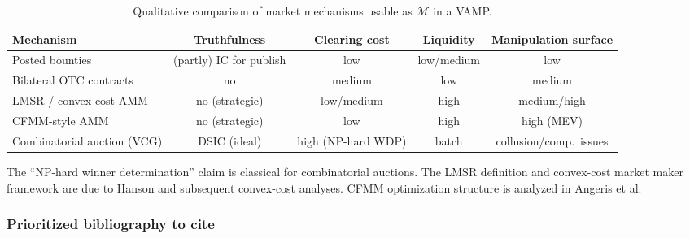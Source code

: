 \begin{table}[t]
\centering
\small
\begin{tabular}{lcccc}
\hline
Mechanism & Truthfulness & Clearing cost & Liquidity & Manipulation surface \\
\hline
Posted bounties & (partly) IC for publish & low & low/medium & low \\
Bilateral OTC contracts & no & medium & low & medium \\
LMSR / convex-cost AMM & no (strategic) & low/medium & high & medium/high \\
CFMM-style AMM & no (strategic) & low & high & high (MEV) \\
Combinatorial auction (VCG) & DSIC (ideal) & high (NP-hard WDP) & batch & collusion/comp.\ issues \\
\hline
\end{tabular}
\caption{Qualitative comparison of market mechanisms usable as \(\mathcal{M}\) in a VAMP.}
\label{tab:vamp-mechanisms}
\end{table}

The ``NP-hard winner determination'' claim is classical for combinatorial auctions. The LMSR definition and convex-cost market maker framework are due to Hanson and subsequent convex-cost analyses. CFMM optimization structure is analyzed in Angeris et al.

\subsubsection{Prioritized bibliography to cite}

